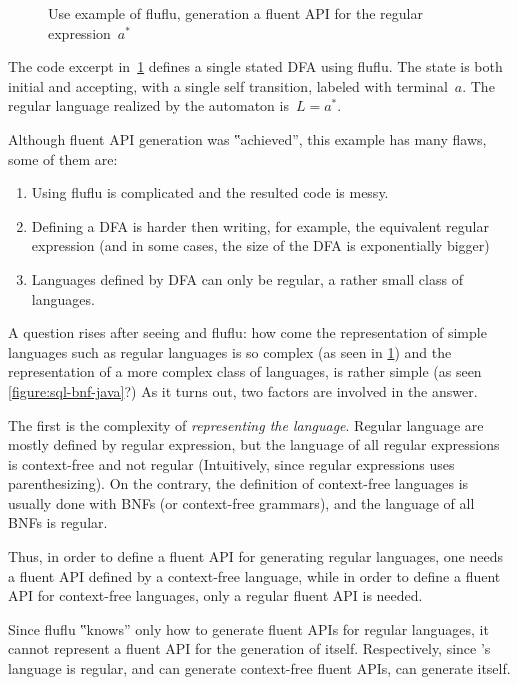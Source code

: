 \begin{figure}[ht]
  \caption{\label{figure:fluflu}
    Use example of fluflu, generation a fluent
  API for the regular expression~\texorpdfstring{$a^*$}{a*}}
\end{figure}
The code excerpt in~\cref{figure:fluflu} defines a single stated DFA using
fluflu. The state is both initial and accepting, with a single self
transition, labeled with terminal~$a$. The regular language realized by the
automaton is~$L=a^*$.

Although fluent API generation was ‟achieved”, this example has many flaws, some of them are:

\begin{enumerate}
  \item Using fluflu is complicated and the resulted code is messy.
  \item Defining a DFA is harder then writing, for example, the equivalent regular
        expression (and in some cases, the size of the DFA is exponentially bigger)
  \item Languages defined by DFA can only be regular, a rather small
        class of languages.
\end{enumerate}

A question rises after seeing \Fajita and fluflu: how come the representation
of simple languages such as regular languages is so complex (as seen in
\cref{figure:fluflu}) and the representation of a more complex class of
languages, is rather simple (as seen \cref{figure:sql-bnf-java}?) As it turns
out, two factors are involved in the answer.

The first is the complexity of \emph{representing the language}.
Regular language are mostly defined by regular expression, but the language of
all regular expressions is context-free and not regular
(Intuitively, since regular expressions uses parenthesizing). On the contrary,
the definition of context-free languages is usually done with BNFs (or 
context-free grammars), and the language of all BNFs is regular.

Thus, in order to define a fluent API for generating regular languages, one needs a
fluent API defined by a context-free language, while in order to define a fluent API for
context-free languages, only a regular fluent API is needed.

Since fluflu ‟knows” only how to generate fluent APIs for regular languages,
it cannot represent a fluent API for the generation of itself.
Respectively, since \Fajita's language is regular, and can generate context-free
  fluent APIs, \Fajita can generate itself.

